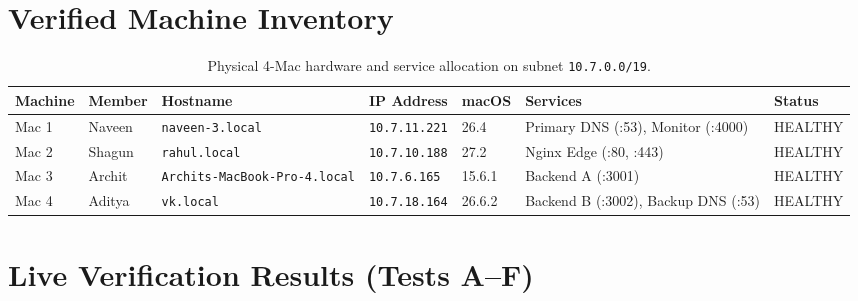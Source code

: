 \documentclass[11pt,a4paper]{article}
\begin{document}
\section{Verified Machine Inventory}

\begin{table}[h!]
\centering
\small
\begin{tabular}{@{}lllllll@{}}
\toprule
\textbf{Machine} & \textbf{Member} & \textbf{Hostname} & \textbf{IP Address} & \textbf{macOS} & \textbf{Services} & \textbf{Status} \\
\midrule
Mac 1 & Naveen & \texttt{naveen-3.local} & \texttt{10.7.11.221} & 26.4 & Primary DNS (:53), Monitor (:4000) & HEALTHY \\
Mac 2 & Shagun & \texttt{rahul.local} & \texttt{10.7.10.188} & 27.2 & Nginx Edge (:80, :443) & HEALTHY \\
Mac 3 & Archit & \texttt{Archits-MacBook-Pro-4.local} & \texttt{10.7.6.165} & 15.6.1 & Backend A (:3001) & HEALTHY \\
Mac 4 & Aditya & \texttt{vk.local} & \texttt{10.7.18.164} & 26.6.2 & Backend B (:3002), Backup DNS (:53) & HEALTHY \\
\bottomrule
\end{tabular}
\caption{Physical 4-Mac hardware and service allocation on subnet \texttt{10.7.0.0/19}.}
\end{table}

\section{Live Verification Results (Tests A--F)}
\end{document}
